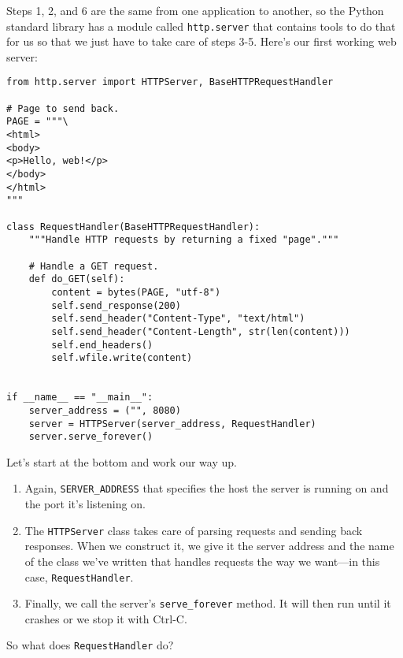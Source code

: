 \documentclass{scrbook}
\begin{document}
Steps 1, 2, and 6 are the same from one application to another,
so the Python standard library has a module called \texttt{http.server}
that contains tools to do that for us
so that we just have to take care of steps 3-5.
Here's our first working web server:


\begin{lstlisting}[frame=single,frameround=tttt]
from http.server import HTTPServer, BaseHTTPRequestHandler

# Page to send back.
PAGE = """\
<html>
<body>
<p>Hello, web!</p>
</body>
</html>
"""

class RequestHandler(BaseHTTPRequestHandler):
    """Handle HTTP requests by returning a fixed "page"."""

    # Handle a GET request.
    def do_GET(self):
        content = bytes(PAGE, "utf-8")
        self.send_response(200)
        self.send_header("Content-Type", "text/html")
        self.send_header("Content-Length", str(len(content)))
        self.end_headers()
        self.wfile.write(content)


if __name__ == "__main__":
    server_address = ("", 8080)
    server = HTTPServer(server_address, RequestHandler)
    server.serve_forever()
\end{lstlisting}



Let's start at the bottom and work our way up.

\begin{enumerate}

\item Again, \texttt{SERVER\_ADDRESS} that specifies the host the server is running on
    and the port it's listening on.

\item The \texttt{HTTPServer} class takes care of parsing requests and sending back responses.
    When we construct it,
    we give it the server address and the name of the class we've written
    that handles requests the way we want—in this case, \texttt{RequestHandler}.

\item Finally, we call the server's \texttt{serve\_forever} method.
    It will then run until it crashes or we stop it with Ctrl-C.

\end{enumerate}


So what does \texttt{RequestHandler} do?
\end{document}
